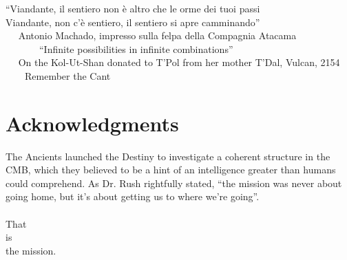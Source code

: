 
\begin{flushright}
``Viandante, il sentiero non \`e altro che le orme dei tuoi passi \\
 Viandante, non c'\`e sentiero, il sentiero si apre camminando''\\ \,\,\,\,\,\,
\scriptsize
Antonio Machado, impresso sulla felpa della Compagnia Atacama \\ \,\,\,\,\,\,\,\,\,\,\,\,\,\,\,\,\,\,\,
\normalsize
``Infinite possibilities in infinite combinations'' \\ \,\,\,\,\,\,
\scriptsize
On the Kol-Ut-Shan donated to T'Pol from her mother T'Dal, Vulcan, 2154
\normalsize \\ \,\,\,\,\,\,\,\,\,\,
Remember the Cant
\end{flushright}

\section*{Acknowledgments}
\lhead[\fancyplain{}{\thepage}]{\fancyplain{}{\rightmark}}
 \thispagestyle{plain}


	The Ancients launched the Destiny to investigate a coherent structure in the CMB, which they believed to be a hint of an intelligence greater than humans could comprehend. As Dr. Rush rightfully stated, ``the mission was never about going home, but it's about getting us to where we're going''. \\ \\
	That \\
	is \\
	the mission.


\clearpage


\thispagestyle{plain}
\par{}
\clearpage

